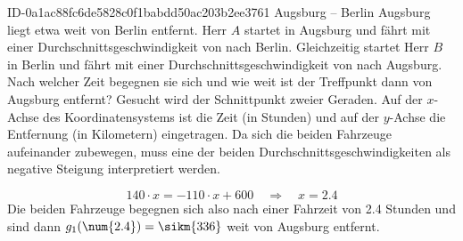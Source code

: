 \begin{exercise}
      {ID-0a1ac88fc6de5828c0f1babdd50ac203b2ee3761}
      {Augsburg -- Berlin}
  \ifproblem\problem
    Augsburg liegt etwa  weit von Berlin entfernt. Herr $A$ startet
    in Augsburg und fährt mit einer Durchschnittsgeschwindigkeit von 
    nach Berlin. Gleichzeitig startet Herr $B$ in Berlin und fährt mit einer
    Durchschnittsgeschwindigkeit von  nach Augsburg.
    Nach welcher Zeit begegnen sie sich und wie weit ist der Treffpunkt dann
    von Augsburg entfernt?
  \fi
  \ifoutline\outline
    Gesucht wird der Schnittpunkt zweier Geraden. Auf der $x$-Achse des Koordinatensystems
    ist die Zeit (in Stunden) und auf der $y$-Achse die Entfernung (in Kilometern) eingetragen.
    Da sich die beiden Fahrzeuge aufeinander zubewegen, muss eine der beiden
    Durchschnittsgeschwindigkeiten als negative Steigung interpretiert werden.
    \begin{center}
    \end{center}
  \fi
  \ifoutcome\outcome
    \begin{equation*}
      \num{140}\cdot x=\num{-110}\cdot x+600
      \quad\Rightarrow\quad
      x=\num{2.4}
    \end{equation*}
    Die beiden Fahrzeuge begegnen sich also nach einer Fahrzeit von \num{2.4}
    Stunden und sind dann $g_1(\num{2.4})=\sikm{336}$ weit von Augsburg entfernt.
  \fi
\end{exercise}
